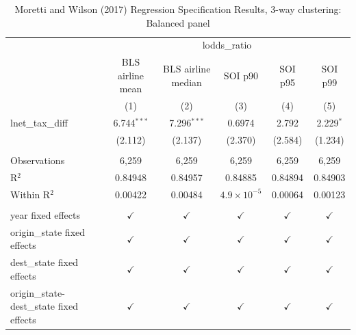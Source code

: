 
\begin{table}[htbp]
   \caption{Moretti and Wilson (2017) Regression Specification Results, 3-way clustering: Balanced panel}
   \bigskip
   \centering
   \small
   \begin{tabular}{lccccc}
      \toprule
       & \multicolumn{5}{c}{lodds\_ratio}\\
                                                & BLS airline mean & BLS airline median & SOI p90              & SOI p95       & SOI p99 \\   
                                                & (1)              & (2)                & (3)                  & (4)           & (5)\\  
      \midrule 
      lnet\_tax\_diff                           & 6.744$^{***}$    & 7.296$^{***}$      & 0.6974               & 2.792         & 2.229$^{*}$\\   
                                                & (2.112)          & (2.137)            & (2.370)              & (2.584)       & (1.234)\\   
       \\
      Observations                              & 6,259            & 6,259              & 6,259                & 6,259         & 6,259\\  
      R$^2$                                     & 0.84948          & 0.84957            & 0.84885              & 0.84894       & 0.84903\\  
      Within R$^2$                              & 0.00422          & 0.00484            & $4.9\times 10^{-5}$  & 0.00064       & 0.00123\\  
       \\
      year fixed effects                        & $\checkmark$     & $\checkmark$       & $\checkmark$         & $\checkmark$  & $\checkmark$\\   
      origin\_state fixed effects               & $\checkmark$     & $\checkmark$       & $\checkmark$         & $\checkmark$  & $\checkmark$\\   
      dest\_state fixed effects                 & $\checkmark$     & $\checkmark$       & $\checkmark$         & $\checkmark$  & $\checkmark$\\   
      origin\_state-dest\_state fixed effects   & $\checkmark$     & $\checkmark$       & $\checkmark$         & $\checkmark$  & $\checkmark$\\   
      \bottomrule
   \end{tabular}
\end{table}


